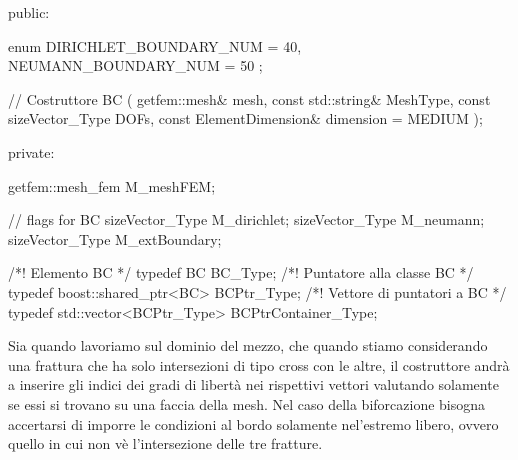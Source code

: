 \newpage	
\begin{Code03_03}[caption={Classe \texttt{BC}}]
public:

    enum
    {
        DIRICHLET_BOUNDARY_NUM = 40,
        NEUMANN_BOUNDARY_NUM = 50
    };

    // Costruttore
    BC ( getfem::mesh& mesh,
         const std::string& MeshType,
         const sizeVector_Type DOFs,
         const ElementDimension& dimension = MEDIUM );

private:

    getfem::mesh_fem M_meshFEM;
    
    // flags for BC
    sizeVector_Type M_dirichlet;
    sizeVector_Type M_neumann;
    sizeVector_Type M_extBoundary;
\end{Code03_03}

\begin{Code03_03}[caption={Typedef per la Classe \texttt{BC}}]
/*! Elemento BC */
typedef BC BC_Type;
/*! Puntatore alla classe BC */												
typedef boost::shared_ptr<BC> BCPtr_Type;
/*! Vettore di puntatori a BC */			
typedef std::vector<BCPtr_Type> BCPtrContainer_Type;	
\end{Code03_03}

Sia quando lavoriamo sul dominio del mezzo, che quando stiamo considerando una frattura che ha solo intersezioni di tipo cross con le altre, il costruttore andrà a inserire gli indici dei gradi di libert\`{a} nei rispettivi vettori valutando solamente se essi si trovano su una faccia della mesh.
Nel caso della biforcazione bisogna accertarsi di imporre le condizioni al bordo solamente nel'estremo libero, ovvero quello in cui non v\`{e} l'intersezione delle tre fratture.

